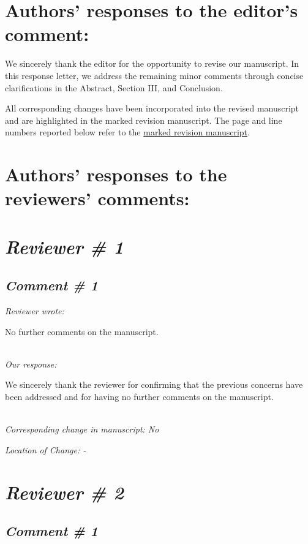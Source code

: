 \documentclass[11pt]{article}
\begin{document}
\section*{\normalsize{Authors' responses to the editor's comment:}}

We sincerely thank the editor for the opportunity to revise our manuscript.
In this response letter, we address the remaining minor comments through concise clarifications in the Abstract, Section III, and Conclusion.

All corresponding changes have been incorporated into the revised manuscript and are highlighted in the marked revision manuscript.
The page and line numbers reported below refer to the \uline{marked revision manuscript}.

\section*{\normalsize{Authors' responses to the reviewers' comments:}}

\section*{\textit{Reviewer \# 1}}
\subsection*{\textit{Comment \# 1}}

\noindent \textit{Reviewer wrote:}

No further comments on the manuscript.

\noindent \textit{\\Our response:}

We sincerely thank the reviewer for confirming that the previous concerns have been addressed and for having no further comments on the manuscript.

\noindent \textit{\\Corresponding change in manuscript: No}

\hspace{40pt} \noindent \textit{Location of Change: -}

\section*{\textit{Reviewer \# 2}}

\subsection*{\textit{Comment \# 1}}
\end{document}
